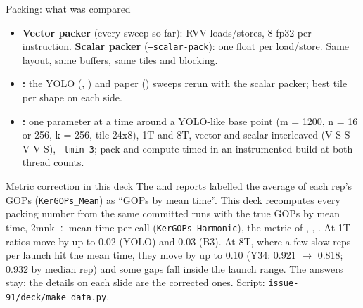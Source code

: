 \begin{frame}{Packing: what was compared}
\small
\begin{itemize}\setlength\itemsep{4pt}
\item \textbf{Vector packer} (every sweep so far): RVV loads/stores, 8 fp32 per instruction. \textbf{Scalar packer} (\texttt{--scalar-pack}): one float per load/store. Same layout, same buffers, same tiles and blocking.
\item \textbf{:} the YOLO (, ) and paper () sweeps rerun with the scalar packer; best tile per shape on each side.
\item \textbf{:} one parameter at a time around a YOLO-like base point (m = 1200, n = 16 or 256, k = 256, tile 24x8), 1T and 8T, vector and scalar interleaved (V S S V V S), \texttt{--tmin 3}; pack and compute timed in an instrumented build at both thread counts.
\end{itemize}
\vspace{4pt}
\begin{block}{Metric correction in this deck}
\scriptsize The  and  reports labelled the average of each rep's GOPs (\texttt{KerGOPs\_Mean}) as ``GOPs by mean time''. This deck recomputes every packing number from the same committed runs with the true GOPs by mean time, 2mnk $\div$ mean time per call (\texttt{KerGOPs\_Harmonic}), the metric of , , . At 1T ratios move by up to 0.02 (YOLO) and 0.03 (B3). At 8T, where a few slow reps per launch hit the mean time, they move by up to 0.10 (Y34: 0.921 $\to$ 0.818; 0.932 by median rep) and some gaps fall inside the launch range. The answers stay; the details on each slide are the corrected ones. Script: \texttt{issue-91/deck/make\_data.py}.
\end{block}
\end{frame}

